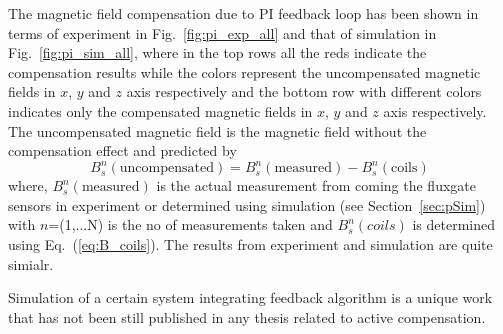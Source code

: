 The magnetic field compensation due to PI feedback loop has been shown in terms of experiment in Fig.~\ref{fig:pi_exp_all} and that of simulation in Fig.~\ref{fig:pi_sim_all}, where in the top rows all the reds indicate the compensation results while the colors represent the uncompensated magnetic fields in $x$, $y$ and $z$ axis respectively and the bottom row with different colors  indicates only the compensated magnetic fields in $x$, $y$ and $z$ axis respectively. The uncompensated magnetic field is the magnetic field without the compensation effect and predicted by
\begin{equation}\label{eq:Buncomp}
    B_s^n(\text{uncompensated})=B_s^n(\text{measured})- B_s^n(\text{coils})
\end{equation}
where, $B_s^n(\text{measured})$ is the actual measurement from coming the fluxgate sensors in experiment or determined using simulation (see Section~\ref{sec:pSim}) with $n$=(1,...N) is the no of measurements taken and $B_s^n(coils)$ is determined using Eq.~(\ref{eq:B_coils}). The results from experiment and simulation are quite simialr.

\FloatBarrier
{}

\FloatBarrier








Simulation of a certain system integrating feedback algorithm is a unique work that has not been still published in any thesis related to active compensation.

